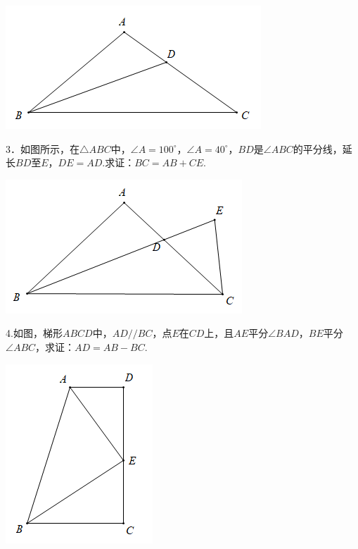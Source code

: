 \documentclass[10pt]{ctexart}
\begin{document}
\begin{flushright}
	\includegraphics[scale=0.6]{figure/jiaopfxian14}
\end{flushright}

\begin{shaded}
3．如图所示，在$\triangle ABC$中，$\angle A=100^\circ$，$\angle A=40^\circ$，$BD$是$\angle ABC$的平分线，延长$BD$至$E$，$DE=AD$.求证：$BC=AB+CE$.
\end{shaded}

\begin{flushright}
	\includegraphics[scale=0.6]{figure/jiaopfxian15}
\end{flushright}

\begin{shaded}
4.如图，梯形$ABCD$中，$AD//BC$，点$E$在$CD$上，且$AE$平分$\angle BAD$，$BE$平分$\angle ABC$，求证：$AD=AB-BC$.
\end{shaded}

\begin{flushright}
	\includegraphics[scale=0.6]{figure/jiaopfxian16}
\end{flushright}
\end{document}
